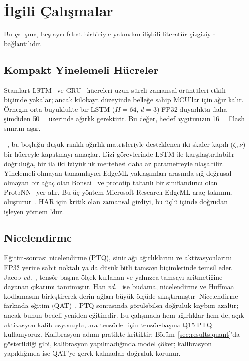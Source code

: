 \section{İlgili Çalışmalar}
\label{sec:related}

Bu çalışma, beş ayrı fakat birbiriyle yakından ilişkili literatür
çizgisiyle bağlantılıdır.

\subsection{Kompakt Yinelemeli Hücreler}

Standart LSTM~\cite{hochreiter1997lstm} ve GRU~\cite{cho2014gru}
hücreleri uzun süreli zamansal örüntüleri etkili biçimde yakalar;
ancak kilobayt düzeyinde belleğe sahip MCU'lar için ağır kalır.
Örneğin orta büyüklükte bir LSTM ($H{=}64$, $d{=}3$) FP32 duyarlıkta
daha şimdiden \SI{50}{\kilo\byte} üzerinde ağırlık gerektirir. Bu
değer, hedef aygıtımızın \SI{16}{\kilo\byte} Flash sınırını aşar.

\fastgrnn{}~\cite{kusupati2018fastgrnn}, bu boşluğu düşük ranklı
ağırlık matrisleriyle desteklenen iki skaler kapılı ($\zeta, \nu$)
bir hücreyle kapatmayı amaçlar. Dizi görevlerinde LSTM ile
karşılaştırılabilir doğruluğa, bir ila iki büyüklük mertebesi daha
az parametreyle ulaşabilir. Yinelemeli olmayan tamamlayıcı EdgeML
yaklaşımları arasında sığ doğrusal olmayan bir ağaç olan
Bonsai~\cite{kumar2017bonsai} ve prototip tabanlı bir sınıflandırıcı
olan ProtoNN~\cite{gupta2017protonn} yer alır. Bu üç yöntem
Microsoft Research EdgeML araç takımını oluşturur~\cite{edgeml}.
HAR için kritik olan zamansal girdiyi, bu üçlü içinde doğrudan
işleyen yöntem \fastgrnn{}'dur.

\subsection{Nicelendirme}

Eğitim-sonrası nicelendirme (PTQ), sinir ağı ağırlıklarını ve
aktivasyonlarını FP32 yerine sabit noktalı ya da düşük bitli tamsayı
biçimlerinde temsil eder. Jacob \emph{vd.}~\cite{jacob2018integer},
tensör-başına ölçek kullanan ve yalnızca tamsayı aritmetiğine dayanan
çıkarımı tanıtmıştır. Han \emph{vd.}~\cite{han2016deepcompression}
ise budama, nicelendirme ve Huffman kodlamasını birleştirerek derin
ağları büyük ölçüde sıkıştırmıştır. Nicelendirme farkında eğitim
(QAT)~\cite{hubara2017qnn}, PTQ sonrasında görülebilen doğruluk
kaybını azaltır; ancak bunun bedeli yeniden eğitimdir. Bu çalışmada
hem ağırlıklar hem de, açık aktivasyon kalibrasyonuyla, ara tensörler
için tensör-başına Q15 PTQ kullanıyoruz. Kalibrasyon adımı pratikte
kritiktir: Bölüm~\ref{sec:results:quant}'da gösterildiği gibi,
kalibrasyon yapılmadığında model çöker; kalibrasyon yapıldığında ise
QAT'ye gerek kalmadan doğruluk korunur.

